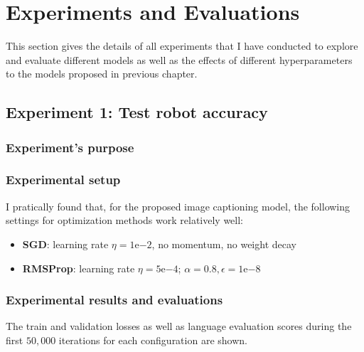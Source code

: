 \section{Experiments and Evaluations}
\label{sec:chap4_experiment}

This section gives the details of all experiments that I have conducted to explore and evaluate different models as well as the effects of different hyperparameters to the models proposed in previous chapter. 


\subsection{Experiment 1: Test robot accuracy}
\subsubsection{Experiment's purpose}

\subsubsection{Experimental setup}
I pratically found that, for the proposed image captioning model, the following settings for optimization methods work relatively well:
	\begin{itemize}
		\item \textbf{SGD}: learning rate $\eta = 1\mathrm{e}{-2}$, no momentum, no weight decay
		\item \textbf{RMSProp}: learning rate $\eta = 5\mathrm{e}{-4}$; $\alpha = 0.8, \epsilon = 1\mathrm{e}{-8}$
	\end{itemize}

\subsubsection{Experimental results and evaluations}

The train and validation losses as well as language evaluation scores during the first $50,000$ iterations for each configuration are shown. 

